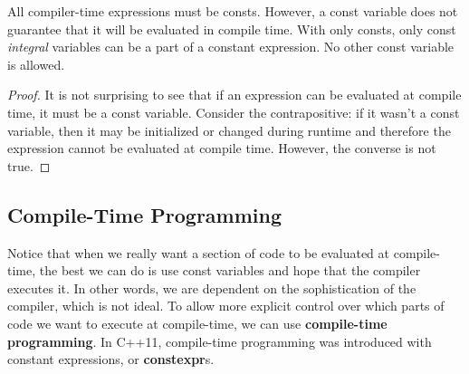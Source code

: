 \documentclass{article}
\begin{document}
    \begin{theorem}
      All compiler-time expressions must be consts. However, a const variable does not guarantee that it will be evaluated in compile time. With only consts, only const \textit{integral} variables can be a part of a constant expression. No other const variable is allowed.
    \end{theorem}
    \begin{proof}
      It is not surprising to see that if an expression can be evaluated at compile time, it must be a const variable. Consider the contrapositive: if it wasn't a const variable, then it may be initialized or changed during runtime and therefore the expression cannot be evaluated at compile time. However, the converse is not true. 
    \end{proof}

  \subsection{Compile-Time Programming}  
    
    Notice that when we really want a section of code to be evaluated at compile-time, the best we can do is use const variables and hope that the compiler executes it. In other words, we are dependent on the sophistication of the compiler, which is not ideal. To allow more explicit control over which parts of code we want to execute at compile-time, we can use \textbf{compile-time programming}. In C++11, compile-time programming was introduced with constant expressions, or \textbf{constexpr}s.
\end{document}
